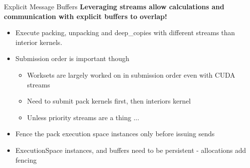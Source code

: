 \begin{comment}
\begin{frame}[fragile]{Performance Results Exercise}
different node, copy to host
     \pgfplotstableread{
 size      Cuda       CudaHostPinnedh CudaUVM    Host
 10        0.008674   0.004455        0.298826   0.001864
 10000     0.013019   0.006524        0.330559   0.040083
 10000000  2.640824   1.422987        29.231414  73.752908
}\tablecompareperformancefullhostnode

\begin{figure}
\centering
\begin{tikzpicture}[scale=0.9]
    \begin{loglogaxis}[
      legend style={legend pos=north west},
      xlabel={N},
      ylabel={time in (s)},
      ymin=1e-3,
      ymax=100,
      grid, thick
    ]
      \addplot table[x expr={\thisrowno{0}}, y index={1}] {\tablecompareperformancefullhostnode};
      \addlegendentry{Cuda}
      \addplot table[x expr={\thisrowno{0}}, y index={2}] {\tablecompareperformancefullhostnode};
      \addlegendentry{CudaHostPinned}
      \addplot table[x expr={\thisrowno{0}}, y index={3}] {\tablecompareperformancefullhostnode};
      \addlegendentry{CudaUVM}
      \addplot table[x expr={\thisrowno{0}}, y index={4}] {\tablecompareperformancefullhostnode};
      \addlegendentry{Host}
      \end{loglogaxis}
    \end{tikzpicture}
\end{figure}
\end{frame}
\end{comment}

\begin{frame}[fragile]{Explicit Message Buffers}
\textbf{Leveraging streams allow calculations and communication with explicit buffers to overlap!}
\begin{itemize}
  \item Execute packing, unpacking and deep\_copies with different streams than interior kernels.
  \item Submission order is important though
  \begin{itemize}
     \item Worksets are largely worked on in submission order even with CUDA streams
     \item Need to submit pack kernels first, then interiors kernel
     \item Unless priority streams are a thing ...
  \end{itemize}
  \item Fence the pack execution space instances only before issuing sends
  \item ExecutionSpace instances, and buffers need to be persistent - allocations add fencing
\end{itemize}
\end{frame}


